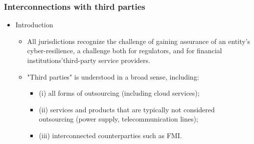 \subsubsection{Interconnections with third parties}
\begin{itemize}
\item Introduction
    \begin{itemize}
    \item All jurisdictions recognize the challenge of gaining assurance of an entity's cyber-resilience, a challenge both for regulators, and for financial institutions'third-party service providers.
    \item "Third parties" is understood in a broad sense, including:
        \begin{itemize}
        \item (i) all forms of outsourcing (including cloud services);
        \item (ii) services and products that are typically not considered outsourcing (power supply, telecommunication lines);
        \item (iii) interconnected counterparties such as FMI. 
        \end{itemize}
    \end{itemize}


    \begin{table}[H]
        \centering
        \caption{Interconnections with Third Parties}
        \renewcommand{\arraystretch}{1.5} %


\end{table}
\end{itemize}

